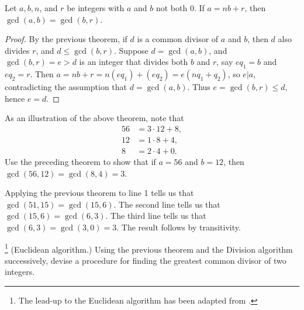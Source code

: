\documentclass[english,course]{lecture}
\renewcommand{\le}{\leqslant}
\newenvironment{solution}[1][Solution]{\begin{trivlist}\pushQED{\qed}\item[\hskip \labelsep  \bfseries #1{}.\hspace{10pt}]}{\popQED\end{trivlist}}\renewcommand{\qedsymbol}{$\checkmark$}{\newenvironment{answer}{\renewcommand\qedsymbol{$\blacklozenge$}\begin{proof}[Answer]}{\end{proof}}}\newenvironment{answer}[1][Answer]{\begin{trivlist}\pushQED{\qed}\item[\hskip \labelsep  \bfseries #1{}.\hspace{10pt}]}{\popQED\end{trivlist}}\renewcommand{\qedsymbol}{$\lozenge$}
\newenvironment{facnote}{\startfacnote}{}
\def\startfacnote#1\end{\margintext{{\sc Note:} #1}\end}
\theoremstyle{plain}
\def\presnotes{}
\begin{document}
\presnotes

\begin{theorem}\label{theorem:gcdremainder}
	Let $a,b,n$, and $r$ be integers with $a$ and $b$ not both 0.
	If $a = n b + r$, then $\gcd(a,b) = \gcd(b,r)$.
\end{theorem}

\begin{proof}
	By the previous theorem, if $d$ is a common divisor of $a$ and $b$, then $d$ also divides $r$, and $d \le \gcd(b,r)$.
	Suppose $d = \gcd(a,b)$, and $\gcd(b,r)= e > d$ is an integer that divides both $b$ and $r$, say $e q_1 = b$ and $e q_2 = r$.
	Then $a = n b + r = n (e q_1) + (e q_2)= e (n q_1 + q_2)$, so $e|a$, contradicting the assumption that $d = \gcd(a,b)$.
	Thus $e = \gcd(b,r) \le d$, hence $e = d$.
\end{proof}

\presnotes




\begin{exer}
	As an illustration of the above theorem, note that 
	\begin{align*}
		56 &= 3\cdot 12 + 8, \\
		12 &= 1\cdot 8 +4,\\
		8 &= 2\cdot 4 + 0.
	\end{align*}
	Use the preceding theorem to show that if $a = 56$ and $b = 12$, then $\gcd(56, 12) = \gcd(8, 4) = 3$.
\end{exer}

\begin{solution}
	Applying the previous theorem to line 1 tells us that $\gcd(51,15) = \gcd(15, 6)$.
	The second line tells us that $\gcd(15,6) = \gcd(6,3)$.
	The third line tells us that $\gcd(6,3) = \gcd(3,0) = 3$.
	The result follows by transitivity.
\end{solution}

\presnotes




\begin{exer}\footnote{The lead-up to the Euclidean algorithm has been adapted from \cite{NTI}.}
	(Euclidean algorithm.) Using the previous theorem and the Division algorithm successively, devise a procedure for finding the greatest common divisor of two integers.
\end{exer}
\end{document}
